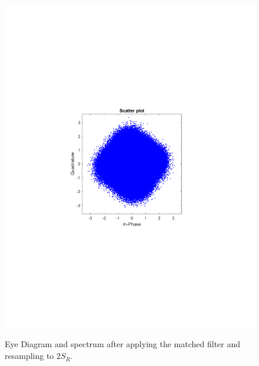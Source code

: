 \begin{refsection}
\begin{figure}[H]
\begin{minipage}{0.30\textwidth}
		\includegraphics[clip, trim=4cm 8cm 4cm 8cm, width=1\textwidth]{./sdf/m_qam_system/figures/expResults/homodyne/2_const_16GBdInSig13dB_AfMF.pdf}
		\label{fig:16GBdSpecBefFec}
	\end{minipage}
	\caption{Eye Diagram and spectrum after applying the matched filter and resampling to $2 S_R$.}
	\label{fig:16GBMFHm}
\end{figure}


\end{refsection}
